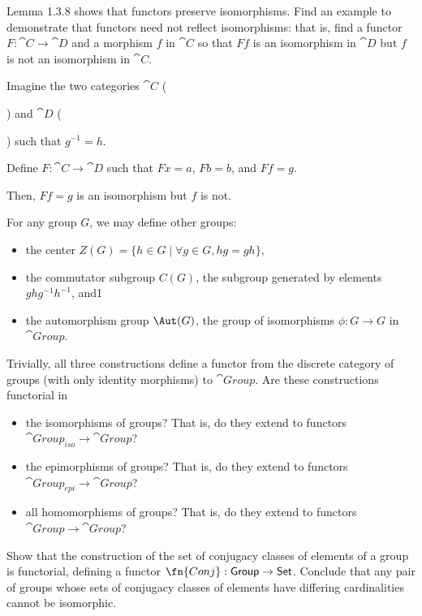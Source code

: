 \documentclass[notes,tikz]{agony}
\renewcommand{\C}{\cat{C}}
\newcommand{\D}{\cat{D}}
\begin{document}
\begin{xca}
  Lemma 1.3.8 shows that functors preserve isomorphisms.
  Find an example to demonstrate that functors need not reflect isomorphisms:
  that is, find a functor $F : \C \to \D$ and a morphism $f$ in $\C$
  so that $Ff$ is an isomorphism in $\D$ but $f$ is not an isomorphism in $\C$.
\end{xca}
\begin{sol}
  Imagine the two categories $\C$ ()
  and $\D$ ()
  such that $g^{-1} = h$.

  Define $F : \C \to \D$ such that $Fx = a$, $Fb = b$, and $Ff = g$.

  Then, $Ff = g$ is an isomorphism but $f$ is not.
\end{sol}

\begin{xca}
  For any group $G$, we may define other groups:
  \begin{itemize}[nosep]
    \item the center $Z(G) = \{ h \in G \mid \forall g \in G, hg = gh \}$,
    \item the commutator subgroup $C(G)$, the subgroup generated by elements $ghg^{-1}h^{-1}$, and1
    \item the automorphism group $\Aut(G)$, the group of isomorphisms $\phi : G \to G$ in $\cat{Group}$.
  \end{itemize}
  Trivially, all three constructions define a functor from the discrete category of groups
  (with only identity morphisms) to $\cat{Group}$.
  Are these constructions functorial in
  \begin{itemize}[nosep]
    \item the isomorphisms of groups? That is, do they extend to functors $\cat{Group_{iso}} → \cat{Group}$?
    \item the epimorphisms of groups? That is, do they extend to functors $\cat{Group_{epi}} → \cat{Group}$?
    \item all homomorphisms of groups? That is, do they extend to functors $\cat{Group} → \cat{Group}$?
  \end{itemize}
\end{xca}

\begin{xca}
  Show that the construction of the set of conjugacy classes of elements of a group is functorial,
  defining a functor $\fn{Conj} : \cat{Group} \to \cat{Set}$.
  Conclude that any pair of groups whose sets of conjugacy classes of elements
  have differing cardinalities cannot be isomorphic.
\end{xca}
\end{document}
